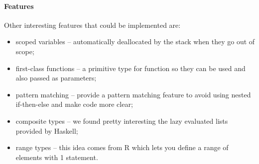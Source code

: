 \paragraph{Features}
Other interesting features that could be implemented are:
\begin{itemize}
	\item scoped variables -- automatically deallocated by the stack when they 
	go out of scope;
	\item first-class functions -- a primitive type for function so they 
	can be used and also passed as parameters;
	\item pattern matching -- provide a pattern matching feature to avoid using
	nested if-then-else and make code more clear;
	\item composite types -- we found pretty interesting the lazy evaluated 
	lists provided by Haskell;
	\item range types -- this idea comes from R which lets you define a
	range of elements with 1 statement.
\end{itemize}
